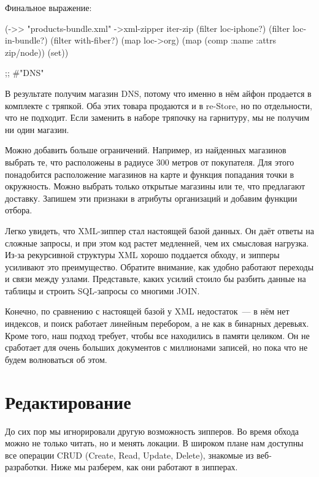 Финальное выражение:

\begin{english}
  \begin{clojure}
(->> "products-bundle.xml"
     ->xml-zipper
     iter-zip
     (filter loc-iphone?)
     (filter loc-in-bundle?)
     (filter with-fiber?)
     (map loc->org)
     (map (comp :name :attrs zip/node))
     (set))

;; #{"DNS"}
  \end{clojure}
\end{english}

В результате получим магазин DNS, потому что именно в нём айфон продается в
комплекте с тряпкой. Оба этих товара продаются и в re-Store, но по отдельности,
что не подходит. Если заменить в наборе тряпочку на гарнитуру, мы не получим ни
один магазин.

Можно добавить больше ограничений. Например, из найденных магазинов выбрать те,
что расположены в радиусе 300 метров от покупателя. Для этого понадобится
расположение магазинов на карте и функция попадания точки в окружность. Можно
выбрать только открытые магазины или те, что предлагают доставку. Запишем эти
признаки в атрибуты организаций и добавим функции отбора.

Легко увидеть, что XML-зиппер стал настоящей базой данных. Он даёт ответы на
сложные запросы, и при этом код растет медленней, чем их смысловая
нагрузка. Из-за рекурсивной структуры XML хорошо поддается обходу, и зипперы
усиливают это преимущество. Обратите внимание, как удобно работают переходы и
связи между узлами. Представьте, каких усилий стоило бы разбить данные на
таблицы и строить SQL-запросы со многими JOIN.

Конечно, по сравнению с настоящей базой у XML недостаток~--- в нём нет индексов, и
поиск работает линейным перебором, а не как в бинарных деревьях. Кроме того, наш
подход требует, чтобы все находились в памяти целиком. Он не сработает для очень
больших документов с миллионами записей, но пока что не будем волноваться об
этом.

\section{Редактирование}

До сих пор мы игнорировали другую возможность зипперов. Во время обхода можно не
только читать, но и менять локации. В широком плане нам доступны все операции
CRUD (Create, Read, Update, Delete), знакомые из веб-разработки. Ниже мы
разберем, как они работают в зипперах.

